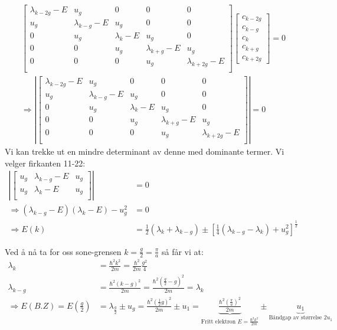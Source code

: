 \documentclass{article}
\begin{document}
\begin{align}
  \begin{bmatrix}
    \lambda_{k-2g} - E& u_g & 0 & 0 & 0 \\
    u_g & \lambda_{k-g} - E & u_g & 0 & 0\\
   0 & u_g & \lambda_{k} - E &  u_g  & 0 \\
   0& 0 & u_g & \lambda_{k+g} - E& u_g  \\
   0& 0 & 0 & u_g & \lambda_{k+2g} - E  \\
  \end{bmatrix} \begin{bmatrix}
  c_{k-2g} \\
  c_{k - g} \\
  c_{k} \\
  c_{k+g}\\
  c_{k+2g}
  \end{bmatrix} = 0 \\
\Rightarrow \left | \begin{bmatrix}
    \lambda_{k-2g} - E& u_g & 0 & 0 & 0 \\
    u_g & \lambda_{k-g} - E & u_g & 0 & 0\\
   0 & u_g & \lambda_{k} - E &  u_g  & 0 \\
   0& 0 & u_g & \lambda_{k+g} - E& u_g  \\
   0& 0 & 0 & u_g & \lambda_{k+2g} - E  \\
  \end{bmatrix} \right | = 0
\end{align}
Vi kan trekke ut en mindre determinant av denne med dominante termer. Vi velger firkanten 11-22:
\begin{align}
  \left | \begin{bmatrix}
      u_g & \lambda_{k-g} - E & u_g\\
     u_g & \lambda_{k} - E &  u_g \\
    \end{bmatrix} \right | &= 0 \\
     \Rightarrow (\lambda_{k-g} - E)(\lambda_k - E) - u_g^2 &= 0 \\
     \Rightarrow E(k) &= \frac{1}{2}\left(\lambda_k + \lambda_{k-g}\right) \pm \left[\frac{1}{4}\left(\lambda_{k-g} - \lambda_k\right) +u_g^2 \right]^{\frac{1}{2}}
\end{align}

Ved å nå ta for oss sone-grensen $k=\frac{g}{2} = \frac{\pi}{a}$ så får vi at:
\begin{align}
  \lambda_k &= \frac{\hbar^2 k^2}{2m} = \frac{\hbar^2}{2m}\frac{g^2}{4} \\
  \lambda_{k-g} &= \frac{\hbar^2(k-g)^2}{2m} = \frac{\hbar^2 (\frac{g}{2}-g)^2}{2m} = \lambda_k \\
  \Rightarrow E(B.Z) = E\left(\frac{g}{2}\right) &= \lambda_{\frac{g}{2}} \pm u_g = \frac{\hbar^2 (\frac{1}{2}g)^2}{2m} \pm u_{1} = \underbrace{\frac{\hbar^2 \left(\frac{\pi}{a}\right)^2}{2m}}_{\text{Fritt elektron } E = \frac{\hbar^2 k^2}{2m}} \pm \underbrace{u_{1}}_{\text{Båndgap av størrelse } 2u_1}
\end{align}
\end{document}

